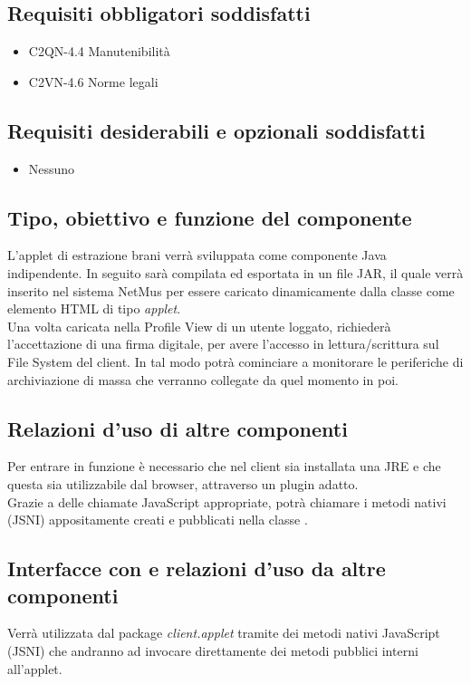 \subsection*{Requisiti obbligatori soddisfatti}
\begin{itemize}
	\item C2QN-4.4 Manutenibilit\`a
	\item C2VN-4.6 Norme legali
\end{itemize}
\subsection*{Requisiti desiderabili e opzionali soddisfatti}
\begin{itemize}
    \item Nessuno
\end{itemize}
\subsection*{Tipo, obiettivo e funzione del componente}
L'applet di estrazione brani verr\`a sviluppata come componente
Java indipendente. In seguito sar\`a compilata ed esportata in un file JAR, il
quale verr\`a inserito nel sistema NetMus per essere caricato dinamicamente
dalla classe  come elemento HTML di tipo \emph{applet}.\\
Una volta caricata nella Profile View di un utente loggato, richieder\`a
l'accettazione di una firma digitale, per avere l'accesso in lettura/scrittura
sul File System del client. In tal modo potr\`a cominciare a monitorare le
periferiche di archiviazione di massa che verranno collegate da quel momento in
poi.
\subsection*{Relazioni d'uso di altre componenti}
Per entrare in funzione \`e necessario che nel client sia installata una JRE e
che questa sia utilizzabile dal browser, attraverso un plugin adatto.\\
Grazie a delle chiamate JavaScript appropriate, potr\`a chiamare i metodi nativi
(JSNI) appositamente creati e pubblicati nella classe .
\subsection*{Interfacce con e relazioni d'uso da altre componenti}
Verr\`a utilizzata dal package \emph{client.applet} tramite dei metodi nativi
JavaScript (JSNI) che andranno ad invocare direttamente dei metodi pubblici
interni  all'applet.
